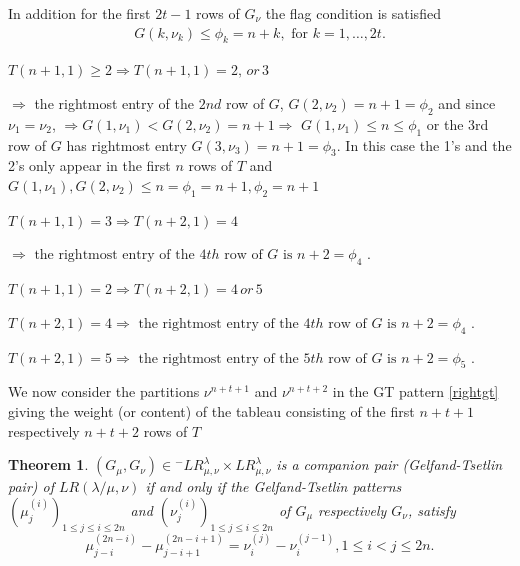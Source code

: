 \documentclass[reqno]{amsart}
\theoremstyle{tplain}
\newtheorem{thm}{Theorem}
\begin{document}
 In addition for the first $2t-1$ rows of $G_\nu$ the flag condition is satisfied
 \begin{align*}G(k,\nu_k)\le \phi_k=n+k, \mbox{ for $k=1,\dots, 2t$}.
 \end{align*}




 $T(n+1,1)\ge 2\Rightarrow T(n+1,1)= 2,\, or\, 3$

 $\Rightarrow$  the rightmost entry of the $2nd$ row of $G$, $G(2,\nu_2)=n+1=\phi_2$  and since $\nu_1=\nu_2$, $\Rightarrow G(1,\nu_1)<G(2,\nu_2)=n+1\Rightarrow$ $ G(1,\nu_1)\le n\le \phi_1$ or the 3rd row of $G$ has rightmost entry $G(3,\nu_3)=n+1=\phi_3$. In this case the 1's and the 2's only appear in the first $n$ rows of $T$ and $G(1,\nu_1), G(2,\nu_2)\le n=\phi_1=n+1, \phi_2=n+1$

 $T(n+1,1)=  3\Rightarrow T(n+2,1)=4$

 $\Rightarrow \mbox{ the rightmost entry of the $4th$ row of $G$ is $n+2=\phi_4$ .}$

 $T(n+1,1)=  2\Rightarrow T(n+2,1)=4\, or \, 5$

 $T(n+2,1)=4\Rightarrow \mbox{ the rightmost entry of the $4th$ row of $G$ is $n+2=\phi_4$ .}$

 $T(n+2,1)= 5 \Rightarrow \mbox{ the rightmost entry of the $5th$ row of $G$ is $n+2=\phi_5$ .}$

 We now consider the partitions $\nu^{n+t+1}$ and $\nu^{n+t+2}$ in the GT pattern \eqref{rightgt}  giving the weight (or content) of the tableau consisting of the first $n+t+1$ respectively $n+t+2$ rows of $T$


\begin{thm} $(G_\mu,G_\nu)\in  {}^-LR^\lambda_{\mu,\nu}\times LR^\lambda_{\mu,\nu}$ is a companion pair (Gelfand-Tsetlin pair)  of $LR(\lambda/\mu,\nu)$ if and only if
 the Gelfand-Tsetlin patterns $(\mu^{(i)}_j)_{1\le j\le i\le 2n}$ and $(\nu^{(i)}_j)_{1\le j\le i\le 2n}$ of $G_\mu$ respectively  $G_\nu$,
satisfy
$$\mu_{j-i}^{(2n-i)}-\mu_{j-i+1}^{(2n-i+1)}=\nu_i^{(j)}-\nu_i^{(j-1)}, 1\le i<j\le 2n.$$
\end{thm}
\fi


\end{document}
